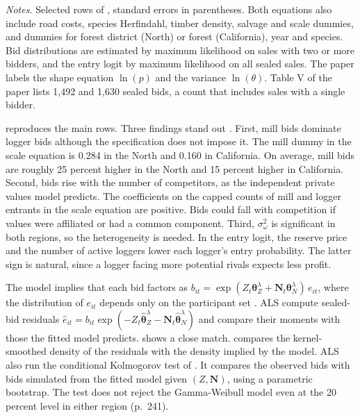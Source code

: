 \begin{table}[htbp]
\smallskip
\begin{minipage}{\linewidth}
\footnotesize\textit{Notes.} Selected rows of \citet[Table IV]{AtheyLevinSeira2011}, standard errors in
parentheses. Both equations also include road costs, species Herfindahl, timber density, salvage and
scale dummies, and dummies for forest district (North) or forest (California), year and species. Bid
distributions are estimated by maximum likelihood on sales with two or more bidders, and the entry logit by
maximum likelihood on all sealed sales. The paper labels the shape equation $\ln(p)$ and the variance
$\ln(\theta)$. Table V of the paper lists 1,492 and 1,630 sealed bids, a count that includes sales with a
single bidder.
\end{minipage}
\end{table}

 reproduces the main rows. Three findings stand out
\citep[p.~238]{AtheyLevinSeira2011}. First, mill bids dominate logger bids although the specification does
not impose it. The mill dummy in the scale equation is 0.284 in the North and 0.160 in California. On
average, mill bids are roughly 25 percent higher in the North and 15 percent higher in California. Second,
bids rise with the number of competitors, as the independent private values model predicts. The
coefficients on the capped counts of mill and logger entrants in the scale equation are positive. Bids
could fall with competition if values were affiliated or had a common component. Third, $\sigma^2_\omega$ is significant in both regions, so the heterogeneity is
needed. In the entry logit, the reserve price and the number of active loggers lower each logger's entry
probability. The latter sign is natural, since a logger facing more potential rivals expects less profit.

The model implies that each bid factors as $b_{it}=\exp(Z_t\bm\theta^\lambda_Z+\bm N_t\bm\theta^\lambda_N)
\,e_{it}$, where the distribution of $e_{it}$ depends only on the participant set
\citep[p.~238]{AtheyLevinSeira2011}. ALS compute sealed-bid residuals $\hat e_{it}=b_{it}\exp(-Z_t\hat{\bm
\theta}^\lambda_Z-\bm N_t\hat{\bm\theta}^\lambda_N)$ and compare their moments with those the fitted model
predicts.  shows a close match.  compares the kernel-smoothed
density of the residuals with the density implied by the model. ALS also run the conditional
Kolmogorov test of \citet{Andrews1997}. It compares the observed bids with bids simulated from the fitted
model given $(Z,\bm N)$, using a parametric bootstrap. The test does not reject the Gamma-Weibull model
even at the 20 percent level in either region (p.~241).

